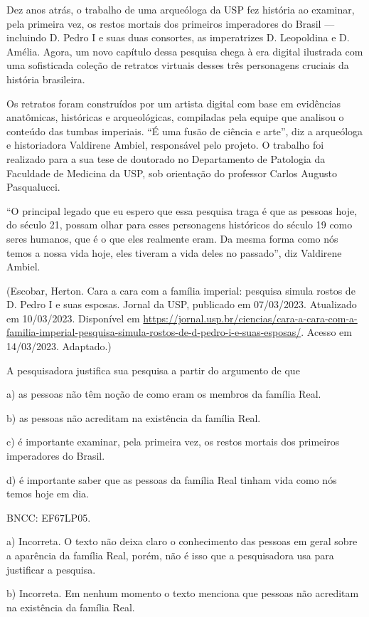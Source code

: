 Dez anos atrás, o trabalho de uma arqueóloga da USP fez história ao
examinar, pela primeira vez, os restos mortais dos primeiros imperadores
do Brasil --- incluindo D. Pedro I e suas duas consortes, as
imperatrizes D. Leopoldina e D. Amélia. Agora, um novo capítulo dessa
pesquisa chega à era digital ilustrada com uma sofisticada coleção de
retratos virtuais desses três personagens cruciais da história
brasileira.

Os retratos foram construídos por um artista digital com base em
evidências anatômicas, históricas e arqueológicas, compiladas pela
equipe que analisou o conteúdo das tumbas imperiais. ``É uma fusão de
ciência e arte'', diz a arqueóloga e historiadora Valdirene Ambiel,
responsável pelo projeto. O trabalho foi realizado para a sua tese de
doutorado no Departamento de Patologia da Faculdade de Medicina da USP,
sob orientação do professor Carlos Augusto Pasqualucci.

``O principal legado que eu espero que essa pesquisa traga é que as
pessoas hoje, do século 21, possam olhar para esses personagens
históricos do século 19 como seres humanos, que é o que eles realmente
eram. Da mesma forma como nós temos a nossa vida hoje, eles tiveram a
vida deles no passado'', diz Valdirene Ambiel.

(Escobar, Herton. Cara a cara com a família imperial: pesquisa simula
rostos de D. Pedro I e suas esposas. Jornal da USP, publicado em
07/03/2023. Atualizado em 10/03/2023. Disponível em
\url{https://jornal.usp.br/ciencias/cara-a-cara-com-a-familia-imperial-pesquisa-simula-rostos-de-d-pedro-i-e-suas-esposas/}.
Acesso em 14/03/2023. Adaptado.)

A pesquisadora justifica sua pesquisa a partir do argumento de que

a) as pessoas não têm noção de como eram os membros da família Real.

b) as pessoas não acreditam na existência da família Real.

c) é importante examinar, pela primeira vez, os restos mortais dos
primeiros imperadores do Brasil.

d) é importante saber que as pessoas da família Real tinham vida como
nós temos hoje em dia.

BNCC: EF67LP05.

a) Incorreta. O texto não deixa claro o conhecimento das pessoas em
geral sobre a aparência da família Real, porém, não é isso que a
pesquisadora usa para justificar a pesquisa.

b) Incorreta. Em nenhum momento o texto menciona que pessoas não
acreditam na existência da família Real.

